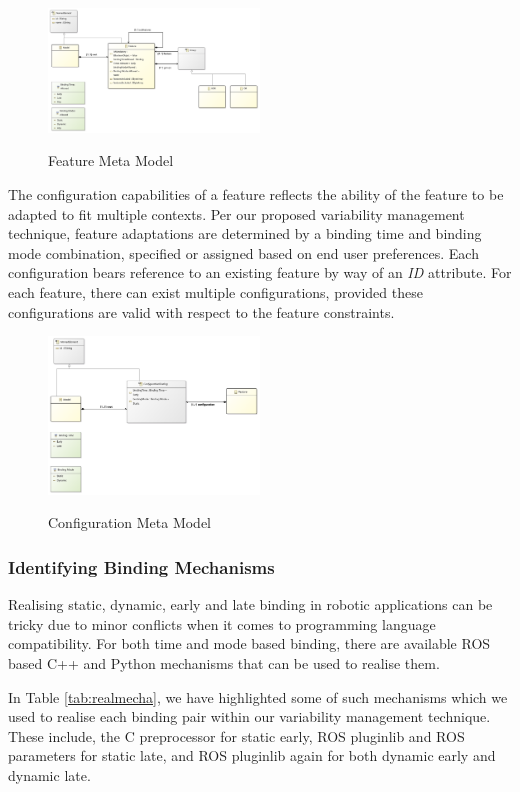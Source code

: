 \documentclass[conference]{IEEEtran}
\begin{document}
\begin{figure}[H]
\caption{Feature Meta Model}
\centering
\includegraphics[width=0.5\textwidth]{diagrams/feature.png}
\label{femet}
\end{figure}

The configuration capabilities of a feature reflects the ability of the feature to be adapted to fit multiple contexts. Per our proposed variability management technique,
feature adaptations are determined by a binding time and binding mode combination, specified or assigned based on end user preferences. Each configuration bears reference to an existing feature by way of an \textit{ID} attribute. For each feature, there can exist multiple configurations, provided these configurations are valid with respect to the feature constraints.

\begin{figure}[H]
\caption{Configuration Meta Model}
\centering
\includegraphics[width=0.5\textwidth]{diagrams/config.png}
\label{conmet}
\end{figure}

\subsubsection{Identifying Binding Mechanisms}
Realising static, dynamic, early and late binding in robotic applications can be tricky due to minor conflicts when it comes to programming language compatibility. For both time and mode based binding, there are available ROS based C++ and Python mechanisms that can be used to realise them.

In Table \ref{tab:realmecha}, we have highlighted some of such mechanisms which we used to realise each binding pair within our variability management technique. These include, the C preprocessor for static early, ROS pluginlib and ROS parameters for static late, and ROS pluginlib again for both dynamic early and dynamic late.
\end{document}
